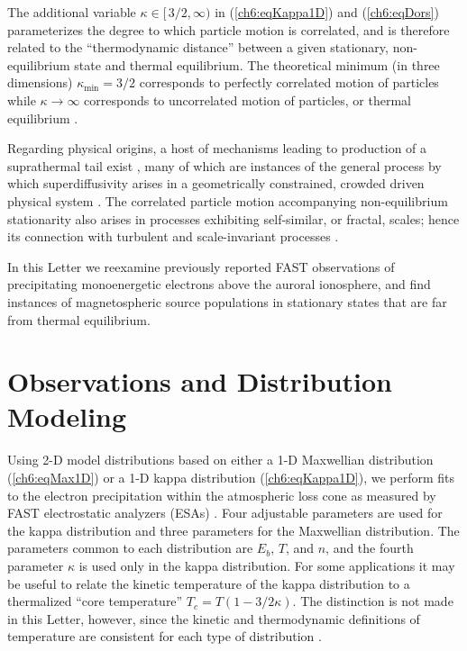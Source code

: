  The additional variable $\kappa \in [ \, 3/2, \infty )$ in
 (\ref{ch6:eqKappa1D}) and (\ref{ch6:eqDors}) parameterizes the degree to
 which particle motion is correlated, and is therefore related to the
 ``thermodynamic distance'' between a given stationary,
 non-equilibrium state and thermal equilibrium. The theoretical
 minimum (in three dimensions) $\kappa_{\textrm{min}} = 3/2$
 corresponds to perfectly correlated motion of particles while $\kappa
 \rightarrow \infty$ corresponds to uncorrelated motion of particles,
 or thermal equilibrium
 \citep{Livadiotis2010,Livadiotis2011,Livadiotis2013}. 

 Regarding physical origins, a host of mechanisms leading to
 production of a suprathermal tail exist \citep[e.g., review
 by][]{Pierrard2010}, many of which are instances of the general
 process by which superdiffusivity arises in a geometrically
 constrained, crowded driven physical system \citep{Benichou2013}.
 The correlated particle motion accompanying non-equilibrium
 stationarity also arises in processes exhibiting self-similar, or
 fractal, scales; hence its connection with turbulent and
 scale-invariant processes \citep{West1990,Treumann1999a,Leubner2004}.

 In this Letter we reexamine previously reported FAST observations of
 precipitating monoenergetic electrons above the auroral ionosphere,
 and find instances of magnetospheric source populations in stationary
 states that are far from thermal equilibrium.

  \section{Observations and Distribution Modeling}

  Using 2-D model distributions based on either a 1-D Maxwellian
  distribution (\ref{ch6:eqMax1D}) or a 1-D kappa distribution
  (\ref{ch6:eqKappa1D}), we perform fits to the electron precipitation
  within the atmospheric loss cone as measured by FAST electrostatic
  analyzers (ESAs) \citep{Carlson2001}. Four adjustable parameters are
  used for the kappa distribution and three parameters for the
  Maxwellian distribution. The parameters common to each distribution
  are $E_b$, $T$, and $n$, and the fourth parameter $\kappa$ is used
  only in the kappa distribution. For some applications
  \citep[e.g.,][]{Sutherland2012} it may be useful to relate the
  kinetic temperature of the kappa distribution to a thermalized
  ``core temperature'' $T_c = T (1-3/2 \kappa)$. The distinction is
  not made in this Letter, however, since the kinetic and
  thermodynamic definitions of temperature are consistent for each
  type of distribution \citet{Livadiotis2010}.

